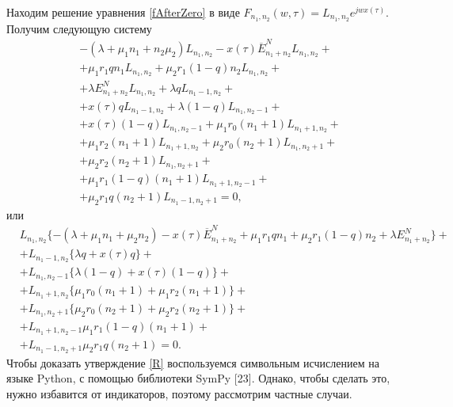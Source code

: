 Находим решение уравнения \eqref{fAfterZero} в виде $F_{n_{1}, n_{2}}(w,\tau)=L_{n_{1}, n_{2}}e^{jwx(\tau)}$. Получим следующую систему\\
\begin{equation*}
	\begin{split}
		&-(\lambda+\mu_{1}n_{1}+n_{2}\mu_{2})L_{n_{1}, n_{2}} 
		- x(\tau)\overline{E}_{n_{1}+n_{2}}^N L_{n_{1}, n_{2}}+\\
		&+ \mu_{1}r_{1}qn_{1}L_{n_{1}, n_{2}}+ \mu_{2}r_{1}(1-q)n_{2}L_{n_{1}, n_{2}}+\\
		&+ \lambda  E_{n_{1}+n_{2}}^N L_{n_{1}, n_{2}}+\lambda qL_{n_{1}-1, n_{2}}+\\
		&+ x(\tau) q  L_{n_{1}-1, n_{2}}+\lambda (1-q)L_{n_{1}, n_{2}-1} +\\
		&+ x(\tau) (1-q) L_{n_{1}, n_{2}-1}+ \mu_{1} r_{0} (n_{1}+1)L_{n_{1} +1 , n_{2}} +\\
		&+ \mu_{1} r_{2} (n_{1}+1) L_{n_{1} + 1, n_{2}}+ \mu_{2} r_{0} (n_{2}+1)L_{n_{1}, n_{2} + 1 }+\\
		& + \mu_{2} r_{2} (n_{2}+1) L_{n_{1}, n_{2} + 1}+\\
		&+\mu_{1} r_{1}(1-q)(n_{1}+1) L_{n_{1} +1 , n_{2}-1}+\\
		&+\mu_{2} r_{1}q (n_{2}+1)L_{n_{1} -1 , n_{2}+1}=0,
	\end{split}
\end{equation*}
или
\begin{equation}\label{sistForR}
	\begin{split}
		&L_{n_{1}, n_{2}}\{-(\lambda+\mu_{1}n_{1}+\mu_{2}n_{2}) - x(\tau)\overline{E}_{n_{1}+n_{2}}^N+ \mu_{1}r_{1}qn_{1}+ \mu_{2}r_{1}(1-q)n_{2}+ \lambda  E_{n_{1}+n_{2}}^N\}+\\
		&+L_{n_{1}-1, n_{2}}\{\lambda q+ x(\tau) q  \}+\\
		&+L_{n_{1}, n_{2}-1}\{\lambda (1-q) + x(\tau) (1-q) \}+\\
		&+L_{n_{1} +1 , n_{2}}\{ \mu_{1} r_{0}(n_{1}+1) + \mu_{1} r_{2} (n_{1}+1)\}+\\
		&+L_{n_{1}, n_{2} + 1 }\{ \mu_{2} r_{0} (n_{2}+1) + \mu_{2} r_{2} (n_{2}+1) \}+\\
		&+ L_{n_{1} +1 , n_{2}-1}\mu_{1} r_{1}(1-q)(n_{1}+1)+\\
		&+L_{n_{1} -1 , n_{2}+1}\mu_{2} r_{1}q(n_{2}+1) =0.
	\end{split}
\end{equation}
Чтобы доказать утверждение \eqref{R} воспользуемся символьным исчислением на языке Python, с помощью библиотеки SymPy [23]. Однако, чтобы сделать это, нужно избавится от индикаторов, поэтому рассмотрим частные случаи.\\

